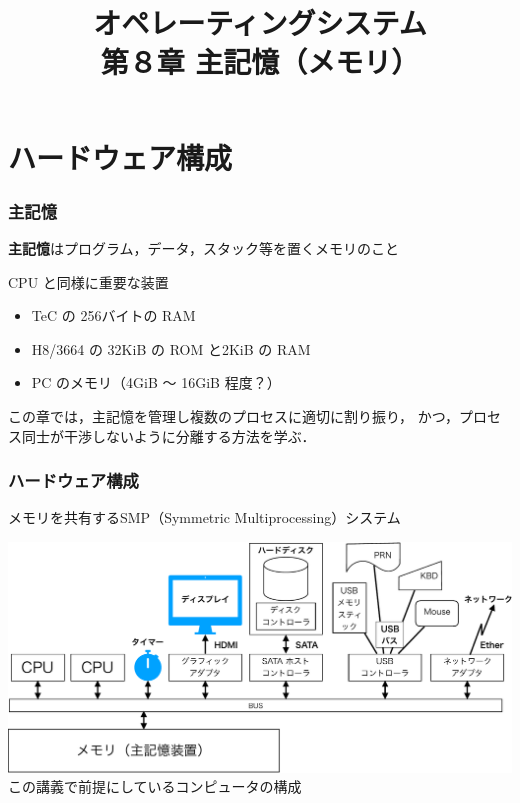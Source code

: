 \documentclass{beamer}                   %
\begin{document}
\title[主記憶]{オペレーティングシステム\\第８章 主記憶（メモリ）}
\date{}

\begin{frame}
  \titlepage
\end{frame}


\section{ハードウェア構成}
\begin{frame}
  \frametitle{主記憶}

{\bf 主記憶}はプログラム，データ，スタック等を置くメモリのこと

CPU と同様に重要な装置

\begin{itemize}
\item TeC の 256バイトの RAM
\item H8/3664 の 32KiB の ROM と2KiB の RAM
\item PC のメモリ（4GiB 〜 16GiB 程度？）
\end{itemize}

この章では，主記憶を管理し複数のプロセスに適切に割り振り，
かつ，プロセス同士が干渉しないように分離する方法を学ぶ．
\end{frame}

\begin{frame}
  \frametitle{ハードウェア構成}
  メモリを共有するSMP（Symmetric Multiprocessing）システム
  \begin{center}
    \includegraphics[scale=0.40]{Fig/hardBlock-crop.pdf}\\
    この講義で前提にしているコンピュータの構成
  \end{center}
\end{frame}
\end{document}

